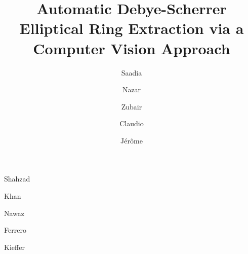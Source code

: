 \documentclass[preprint]{iucr}              %
\begin{document}



\title{Automatic Debye-Scherrer Elliptical Ring Extraction via a Computer Vision Approach}


\author[a]{Saadia}{Shahzad}%
\author[a]{Nazar}{Khan}%
\author[a]{Zubair}{Nawaz}%
\author[b]{Claudio}{Ferrero}%
\author[b]{J\'er\^ome}{Kieffer}%








\end{document}

